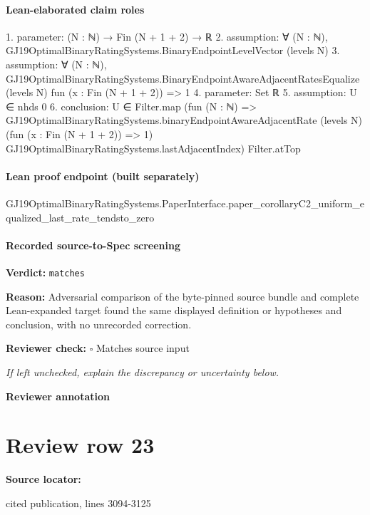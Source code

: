 \documentclass[10pt]{article}
\newcommand{\reviewerbox}{%
  \par\noindent\fbox{\parbox{0.96\linewidth}{\rule{0pt}{0.38in}}}\par
}
\newcommand{\reviewmatch}[1]{%
  \par\noindent\textbf{Reviewer check:} $\square$\; #1\par
  \noindent\emph{If left unchecked, explain the discrepancy or uncertainty below.}\par
}
\begin{document}
\paragraph{Lean-elaborated claim roles}\begin{ReviewVerbatim}
1. parameter: (N : ℕ) → Fin (N + 1 + 2) → ℝ
2. assumption: ∀ (N : ℕ), GJ19OptimalBinaryRatingSystems.BinaryEndpointLevelVector (levels N)
3. assumption: ∀ (N : ℕ),
  GJ19OptimalBinaryRatingSystems.BinaryEndpointAwareAdjacentRatesEqualize (levels N) fun (x : Fin (N + 1 + 2)) => 1
4. parameter: Set ℝ
5. assumption: U ∈ nhds 0
6. conclusion: U ∈
  Filter.map
    (fun (N : ℕ) =>
      GJ19OptimalBinaryRatingSystems.binaryEndpointAwareAdjacentRate (levels N) (fun (x : Fin (N + 1 + 2)) => 1)
        GJ19OptimalBinaryRatingSystems.lastAdjacentIndex)
    Filter.atTop
\end{ReviewVerbatim}

\paragraph{Lean proof endpoint (built separately)}\begin{ReviewVerbatim}
GJ19OptimalBinaryRatingSystems.PaperInterface.paper_corollaryC2_uniform_equalized_last_rate_tendsto_zero
\end{ReviewVerbatim}

\paragraph{Recorded source-to-Spec screening}
\textbf{Verdict:} \texttt{matches}
\\
{\raggedright
\textbf{Reason:} Adversarial comparison of the byte-\allowbreak{}pinned source bundle and complete Lean-\allowbreak{}expanded target found the same displayed definition or hypotheses and conclusion, with no unrecorded correction.\allowbreak{}
\par}
\reviewmatch{Matches source input}
\noindent\textbf{Reviewer annotation}\par
\reviewerbox
\clearpage
\hypertarget{source-claim-510e870d600e0e8e}{}
\section*{Review row 23}
\textbf{Source locator:} {\footnotesize\raggedright cited publication, lines 3094-\allowbreak{}3125\par}
\end{document}
